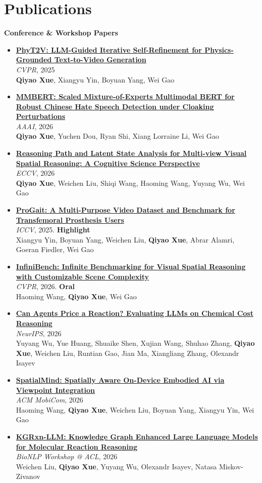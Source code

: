 \documentclass[11pt,letterpaper]{article}
\newcommand{\me}{\textbf{Qiyao Xue}}
\newcommand{\venue}[1]{\textit{#1}}
\newcommand{\highlight}[1]{\textbf{\color{BrickRed}#1}}
\newcommand{\pub}[3]{\item {\hypersetup{urlcolor=accent}\textbf{#2}}\\ #3\\ #1}
\begin{document}
\section{Publications}
\textbf{Conference \& Workshop Papers}
\begin{itemize}[itemsep=0.3em]
  \pub{\me, Xiangyu Yin, Boyuan Yang, Wei Gao}
      {\href{https://openaccess.thecvf.com/content/CVPR2025/papers/Xue_PhyT2V_LLM-Guided_Iterative_Self-Refinement_for_Physics-Grounded_Text-to-Video_Generation_CVPR_2025_paper.pdf}{PhyT2V: LLM-Guided Iterative Self-Refinement for Physics-Grounded Text-to-Video Generation}}
      {\venue{CVPR}, 2025}
  \pub{\me, Yuchen Dou, Ryan Shi, Xiang Lorraine Li, Wei Gao}
      {\href{https://arxiv.org/pdf/2508.00760}{MMBERT: Scaled Mixture-of-Experts Multimodal BERT for Robust Chinese Hate Speech Detection under Cloaking Perturbations}}
      {\venue{AAAI}, 2026}
  \pub{\me, Weichen Liu, Shiqi Wang, Haoming Wang, Yuyang Wu, Wei Gao}
      {\href{https://arxiv.org/pdf/2512.02340}{Reasoning Path and Latent State Analysis for Multi-view Visual Spatial Reasoning: A Cognitive Science Perspective}}
      {\venue{ECCV}, 2026}
  \pub{Xiangyu Yin, Boyuan Yang, Weichen Liu, \me, Abrar Alamri, Goeran Fiedler, Wei Gao}
      {\href{https://arxiv.org/pdf/2507.10223}{ProGait: A Multi-Purpose Video Dataset and Benchmark for Transfemoral Prosthesis Users}}
      {\venue{ICCV}, 2025. \highlight{Highlight}}
  \pub{Haoming Wang, \me, Wei Gao}
      {\href{https://arxiv.org/pdf/2511.18200}{InfiniBench: Infinite Benchmarking for Visual Spatial Reasoning with Customizable Scene Complexity}}
      {\venue{CVPR}, 2026. \highlight{Oral}}
  \pub{Yuyang Wu, Yue Huang, Shuaike Shen, Xujian Wang, Shuhao Zhang, \me, Weichen Liu, Runtian Gao, Jian Ma,
       Xiangliang Zhang, Olexandr Isayev}
      {\href{https://arxiv.org/pdf/2605.07251}{Can Agents Price a Reaction? Evaluating LLMs on Chemical Cost Reasoning}}
      {\venue{NeurIPS}, 2026}
  \pub{Haoming Wang, \me, Weichen Liu, Boyuan Yang, Xiangyu Yin, Wei Gao}
      {\href{https://sites.pitt.edu/~weigao/publications/mobicom26-spatialmind.pdf}{SpatialMind: Spatially Aware On-Device Embodied AI via Viewpoint Integration}}
      {\venue{ACM MobiCom}, 2026}
  \pub{Weichen Liu, \me, Yuyang Wu, Olexandr Isayev, Natasa Miskov-Zivanov}
      {\href{https://aclanthology.org/2026.bionlp-1.22.pdf}{KGRxn-LLM: Knowledge Graph Enhanced Large Language Models for Molecular Reaction Reasoning}}
      {\venue{BioNLP Workshop @ ACL}, 2026}
\end{itemize}
\end{document}
